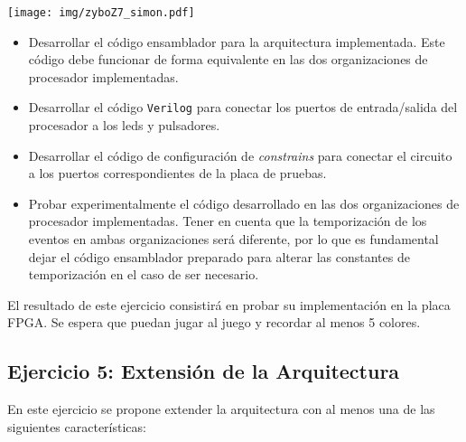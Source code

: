\documentclass[a4paper,11pt]{article}
\begin{document}
\begin{center}
 
\texttt{[image: img/zyboZ7\_simon.pdf]}
\end{center}

\begin{itemize}
 \item Desarrollar el código ensamblador para la arquitectura implementada. Este código debe funcionar de forma equivalente en las dos organizaciones de procesador implementadas.

 \item Desarrollar el código \texttt{Verilog} para conectar los puertos de entrada/salida del procesador a los leds y pulsadores.
 
 \item Desarrollar el código de configuración de \emph{constrains} para conectar el circuito a los puertos correspondientes de la placa de pruebas.
 
 \item Probar experimentalmente el código desarrollado en las dos organizaciones de procesador implementadas. Tener en cuenta que la temporización de los eventos en ambas organizaciones será diferente, por lo que es fundamental dejar el código ensamblador preparado para alterar las constantes de temporización en el caso de ser necesario.
\end{itemize}

El resultado de este ejercicio consistirá en probar su implementación en la placa FPGA. Se espera que puedan jugar al juego y recordar al menos 5 colores.

\subsection{Ejercicio 5: Extensión de la Arquitectura}

En este ejercicio se propone extender la arquitectura con al menos una de las siguientes características:
\end{document}
